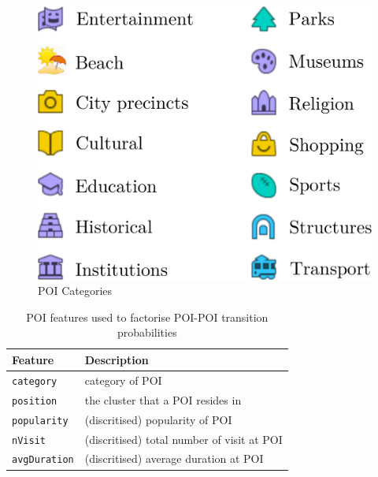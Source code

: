 \begin{figure}[t]
	\centering
	\includegraphics[width=0.6\columnwidth]{fig/poi_cats.pdf}
	\caption{POI Categories}
	\label{fig:poicats}
\end{figure}


\begin{table}[t]
\caption{POI features used to factorise POI-POI transition probabilities}
\label{tab:featuretran}
\centering
\begin{tabular}{l|l} \hline
\textbf{Feature}     & \textbf{Description} \\ \hline
\texttt{category}    & category of POI \\
\texttt{position}    & the cluster that a POI resides in \\
\texttt{popularity}  & (discritised) popularity of POI \\
\texttt{nVisit}      & (discritised) total number of visit at POI \\
\texttt{avgDuration} & (discritised) average duration at POI \\ \hline
\end{tabular}
\end{table}


